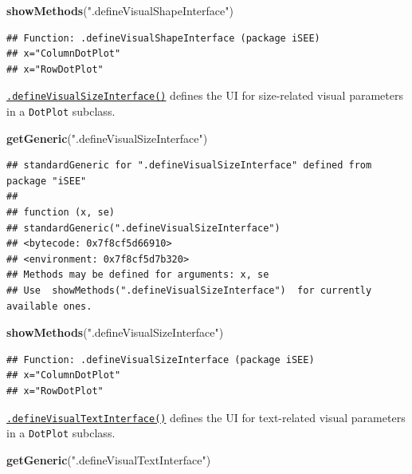 \documentclass[
]{book}
\newenvironment{Shaded}{\begin{snugshade}}{\end{snugshade}}
\newcommand{\KeywordTok}[1]{\textcolor[rgb]{0.13,0.29,0.53}{\textbf{#1}}}
\newcommand{\NormalTok}[1]{#1}
\newcommand{\StringTok}[1]{\textcolor[rgb]{0.31,0.60,0.02}{#1}}
\begin{document}
\begin{Shaded}
\begin{Highlighting}[]
\KeywordTok{showMethods}\NormalTok{(}\StringTok{".defineVisualShapeInterface"}\NormalTok{)}
\end{Highlighting}
\end{Shaded}

\begin{verbatim}
## Function: .defineVisualShapeInterface (package iSEE)
## x="ColumnDotPlot"
## x="RowDotPlot"
\end{verbatim}

\href{https://isee.github.io/iSEE/reference/visual-parameters-generics.html}{\texttt{.defineVisualSizeInterface()}} defines the UI for size-related visual parameters in a \texttt{DotPlot} subclass.

\begin{Shaded}
\begin{Highlighting}[]
\KeywordTok{getGeneric}\NormalTok{(}\StringTok{".defineVisualSizeInterface"}\NormalTok{)}
\end{Highlighting}
\end{Shaded}

\begin{verbatim}
## standardGeneric for ".defineVisualSizeInterface" defined from package "iSEE"
## 
## function (x, se) 
## standardGeneric(".defineVisualSizeInterface")
## <bytecode: 0x7f8cf5d66910>
## <environment: 0x7f8cf5d7b320>
## Methods may be defined for arguments: x, se
## Use  showMethods(".defineVisualSizeInterface")  for currently available ones.
\end{verbatim}

\begin{Shaded}
\begin{Highlighting}[]
\KeywordTok{showMethods}\NormalTok{(}\StringTok{".defineVisualSizeInterface"}\NormalTok{)}
\end{Highlighting}
\end{Shaded}

\begin{verbatim}
## Function: .defineVisualSizeInterface (package iSEE)
## x="ColumnDotPlot"
## x="RowDotPlot"
\end{verbatim}

\href{https://isee.github.io/iSEE/reference/visual-parameters-generics.html}{\texttt{.defineVisualTextInterface()}} defines the UI for text-related visual parameters in a \texttt{DotPlot} subclass.

\begin{Shaded}
\begin{Highlighting}[]
\KeywordTok{getGeneric}\NormalTok{(}\StringTok{".defineVisualTextInterface"}\NormalTok{)}
\end{Highlighting}
\end{Shaded}
\end{document}
